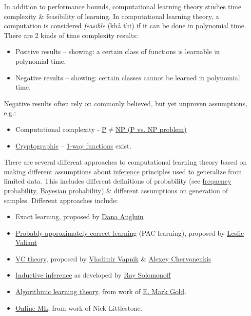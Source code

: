 \documentclass{article}
\begin{document}
In addition to performance bounds, computational learning theory studies time complexity \& feasibility of learning. In computational learning theory, a computation is considered {\it feasible} (khả thi) if it can be done in \href{https://en.wikipedia.org/wiki/Polynomial_time}{polynomial time}. There are 2 kinds of time complexity results:
\begin{itemize}
	\item Positive results -- showing: a certain class of functions is learnable in polynomial time.
	\item Negative results -- showing: certain classes cannot be learned in polynomial time.
\end{itemize}
Negative results often rely on commonly believed, but yet unproven assumptions, e.g.:
\begin{itemize}
	\item Computational complexity - \href{https://en.wikipedia.org/wiki/P_versus_NP_problem}{P$\ne$NP (P vs. NP problem)}
	\item \href{https://en.wikipedia.org/wiki/Cryptography}{Cryptographic} -- \href{https://en.wikipedia.org/wiki/One-way_function}{1-way functions} exist.
\end{itemize}
There are several different approaches to computational learning theory based on making different assumptions about \href{https://en.wikipedia.org/wiki/Inference}{inference} principles used to generalize from limited data. This includes different definitions of probability (see \href{https://en.wikipedia.org/wiki/Frequency_probability}{frequency probability}, \href{https://en.wikipedia.org/wiki/Bayesian_probability}{Bayesian probability}) \& different assumptions on generation of samples. Different approaches include:
\begin{itemize}
	\item Exact learning, proposed by \href{https://en.wikipedia.org/wiki/Dana_Angluin}{\sc Dana Angluin}
	\item \href{https://en.wikipedia.org/wiki/Probably_approximately_correct_learning}{Probably approximately correct learning} (PAC learning), proposed by \href{https://en.wikipedia.org/wiki/Leslie_Valiant}{\sc Leslie Valiant}
	\item \href{https://en.wikipedia.org/wiki/VC_theory}{VC theory}, proposed by \href{https://en.wikipedia.org/wiki/Vladimir_Vapnik}{\sc Vladimir Vapnik} \& \href{https://en.wikipedia.org/wiki/Alexey_Chervonenkisv}{\sc Alexey Chervonenkis}
	\item \href{https://en.wikipedia.org/wiki/Solomonoff%27s_theory_of_inductive_inference}{Inductive inference} as developed by \href{https://en.wikipedia.org/wiki/Ray_Solomonoff}{\sc Ray Solomonoff}
	\item \href{https://en.wikipedia.org/wiki/Algorithmic_learning_theory}{Algorithmic learning theory}, from work of \href{https://en.wikipedia.org/wiki/E._Mark_Gold}{\sc E. Mark Gold}.
	\item \href{https://en.wikipedia.org/wiki/Online_machine_learning}{Online ML}, from work of {\sc Nick Littlestone}.
\end{itemize}
\end{document}
